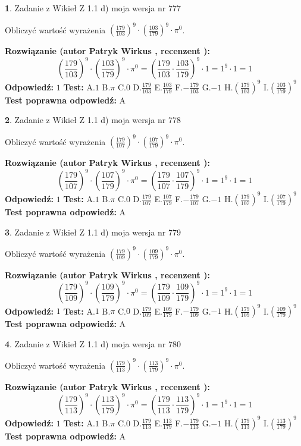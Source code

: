 \documentclass[12pt, a4paper]{article}
\theoremstyle{definition} %
\newtheorem{zad}{}
\newcommand{\zadStart}[1]{\begin{zad}#1\newline}
\newcommand{\zadStop}{\end{zad}}
\newcommand{\rozwStart}[2]{\noindent \textbf{Rozwiązanie (autor #1 , recenzent #2): }\newline}
\newcommand{\rozwStop}{\newline}
\newcommand{\odpStart}{\noindent \textbf{Odpowiedź:}\newline}
\newcommand{\odpStop}{\newline}
\newcommand{\testStart}{\noindent \textbf{Test:}\newline}
\newcommand{\testStop}{\newline}
\newcommand{\kluczStart}{\noindent \textbf{Test poprawna odpowiedź:}\newline}
\newcommand{\kluczStop}{\newline}
\begin{document}
\zadStart{Zadanie z Wikieł Z 1.1 d) moja wersja nr 777}

Obliczyć wartość wyrażenia $(\frac{179}{103})^{9} \cdot (\frac{103}{179})^{9} \cdot \pi^{0}$.
\zadStop
\rozwStart{Patryk Wirkus}{}
$$(\frac{179}{103})^{9} \cdot (\frac{103}{179})^{9} \cdot \pi^{0} = (\frac{179}{103} \cdot \frac{103}{179})^{9} \cdot 1 = 1^{9} \cdot 1 = 1$$
\rozwStop
\odpStart
$1$
\odpStop
\testStart
A.$1$ B.$\pi$ C.$0$ D.$\frac{179}{103}$ E.$\frac{103}{179}$
F.$-\frac{179}{103}$ G.$-1$
H.$(\frac{179}{103})^{9}$
I.$(\frac{103}{179})^{9}$
\testStop
\kluczStart
A
\kluczStop



\zadStart{Zadanie z Wikieł Z 1.1 d) moja wersja nr 778}

Obliczyć wartość wyrażenia $(\frac{179}{107})^{9} \cdot (\frac{107}{179})^{9} \cdot \pi^{0}$.
\zadStop
\rozwStart{Patryk Wirkus}{}
$$(\frac{179}{107})^{9} \cdot (\frac{107}{179})^{9} \cdot \pi^{0} = (\frac{179}{107} \cdot \frac{107}{179})^{9} \cdot 1 = 1^{9} \cdot 1 = 1$$
\rozwStop
\odpStart
$1$
\odpStop
\testStart
A.$1$ B.$\pi$ C.$0$ D.$\frac{179}{107}$ E.$\frac{107}{179}$
F.$-\frac{179}{107}$ G.$-1$
H.$(\frac{179}{107})^{9}$
I.$(\frac{107}{179})^{9}$
\testStop
\kluczStart
A
\kluczStop



\zadStart{Zadanie z Wikieł Z 1.1 d) moja wersja nr 779}

Obliczyć wartość wyrażenia $(\frac{179}{109})^{9} \cdot (\frac{109}{179})^{9} \cdot \pi^{0}$.
\zadStop
\rozwStart{Patryk Wirkus}{}
$$(\frac{179}{109})^{9} \cdot (\frac{109}{179})^{9} \cdot \pi^{0} = (\frac{179}{109} \cdot \frac{109}{179})^{9} \cdot 1 = 1^{9} \cdot 1 = 1$$
\rozwStop
\odpStart
$1$
\odpStop
\testStart
A.$1$ B.$\pi$ C.$0$ D.$\frac{179}{109}$ E.$\frac{109}{179}$
F.$-\frac{179}{109}$ G.$-1$
H.$(\frac{179}{109})^{9}$
I.$(\frac{109}{179})^{9}$
\testStop
\kluczStart
A
\kluczStop



\zadStart{Zadanie z Wikieł Z 1.1 d) moja wersja nr 780}

Obliczyć wartość wyrażenia $(\frac{179}{113})^{9} \cdot (\frac{113}{179})^{9} \cdot \pi^{0}$.
\zadStop
\rozwStart{Patryk Wirkus}{}
$$(\frac{179}{113})^{9} \cdot (\frac{113}{179})^{9} \cdot \pi^{0} = (\frac{179}{113} \cdot \frac{113}{179})^{9} \cdot 1 = 1^{9} \cdot 1 = 1$$
\rozwStop
\odpStart
$1$
\odpStop
\testStart
A.$1$ B.$\pi$ C.$0$ D.$\frac{179}{113}$ E.$\frac{113}{179}$
F.$-\frac{179}{113}$ G.$-1$
H.$(\frac{179}{113})^{9}$
I.$(\frac{113}{179})^{9}$
\testStop
\kluczStart
A
\kluczStop
\end{document}
